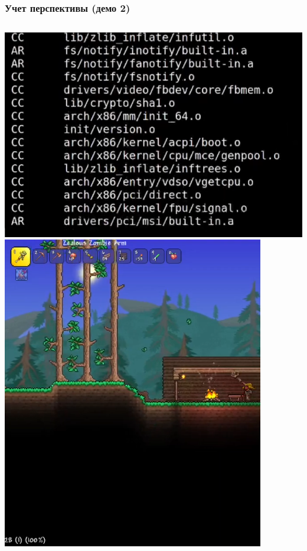 \documentclass[aspectratio=169]{beamer}
\begin{document}
\begin{frame}
  \frametitle{Учет перспективы (демо 2)}
  \vspace*{0.2cm}
  \begin{columns}
      \includegraphics[width=\linewidth]{res/D1_0.png}
      \includegraphics[width=0.85\linewidth]{res/D1_1.png}
  \end{columns}
\end{frame}
\end{document}
